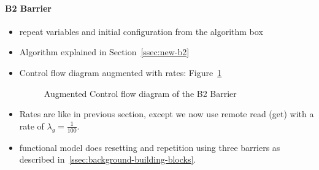 \documentclass[a4paper, 10pt]{article}
\begin{document}
\paragraph{B2 Barrier}
\label{ssssec:analysis-modelchecking-modelling-b2}
\begin{itemize}
	\item repeat variables and initial configuration from the algorithm box
	\item Algorithm explained in Section~\ref{ssec:new-b2}
	\item Control flow diagram augmented with rates: Figure~\ref{fig:model-b2}
		\begin{figure}[htbp]
			\centering
			
			\caption{Augmented Control flow diagram of the B2 Barrier}
			\label{fig:model-b2}
		\end{figure}
	\item Rates are like in previous section, except we now use remote read (get) with a rate of $\lambda_g = \frac{1}{100}$.
	\item functional model does resetting and repetition using three barriers as described in~\ref{ssec:background-building-blocks}.
\end{itemize}

\end{document}
